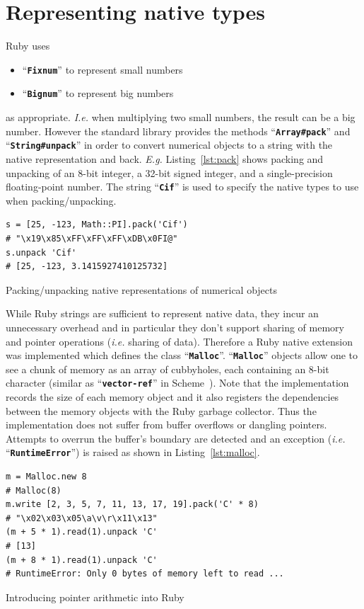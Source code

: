 \documentclass[10pt,journal,compsoc]{joser1}
\newcommand{\code}[1]{``\texttt{\textbf{\textcolor{codegray}{\small{#1}}}}''}
\newcommand{\lst}[1]{Listing~\ref{lst:#1}}
\begin{document}
\section{Representing native types}
Ruby uses
\begin{itemize}
  \item \code{Fixnum} to represent small numbers
  \item \code{Bignum} to represent big numbers
\end{itemize}
as appropriate.  \emph{I.e.} when multiplying two small numbers, the result can
be a big number. However the standard library provides the methods
\code{Array\#pack} and \code{String\#unpack} in order to convert numerical
objects to a string with the native representation and back. \emph{E.g.}
\lst{pack} shows packing and unpacking of an 8-bit integer, a 32-bit signed
integer, and a single-precision floating-point number. The string \code{Cif} is
used to specify the native types to use when packing/unpacking.
\begin{listing}[htbp]
  \begin{verbatim}
s = [25, -123, Math::PI].pack('Cif')
# "\x19\x85\xFF\xFF\xFF\xDB\x0FI@"
s.unpack 'Cif'
# [25, -123, 3.1415927410125732]
  \end{verbatim}
  \caption{Packing/unpacking native representations of numerical
  objects\label{lst:pack}}
\end{listing}

While Ruby strings are sufficient to represent native data, they incur an
unnecessary overhead and in particular they don't support sharing of memory and
pointer operations (\emph{i.e.} sharing of data). Therefore a Ruby native
extension was implemented which defines the class \code{Malloc}. \code{Malloc}
objects allow one to see a chunk of memory as an array of cubbyholes, each
containing an 8-bit character (similar as \code{vector-ref} in
Scheme~\citep{abelson1996structure})\citep{thesis_wedekind}. Note that the
implementation records the size of each memory object and it also registers the
dependencies between the memory objects with the Ruby garbage collector. Thus
the implementation does not suffer from buffer overflows or dangling pointers.
Attempts to overrun the buffer's boundary are detected and an exception
(\emph{i.e.} \code{RuntimeError}) is raised as shown in \lst{malloc}.
\begin{listing}[htbp]
  \begin{verbatim}
m = Malloc.new 8
# Malloc(8)
m.write [2, 3, 5, 7, 11, 13, 17, 19].pack('C' * 8)
# "\x02\x03\x05\a\v\r\x11\x13"
(m + 5 * 1).read(1).unpack 'C'
# [13]
(m + 8 * 1).read(1).unpack 'C'
# RuntimeError: Only 0 bytes of memory left to read ...

  \end{verbatim}
  \caption{Introducing pointer arithmetic into Ruby\label{lst:malloc}}
\end{listing}
\end{document}
